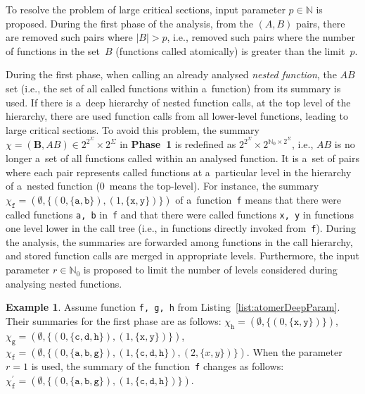 \documentclass{ExcelAtFIT}
\theoremstyle{definition}
\newtheorem{example}{Example}[section]
\begin{document}
To resolve the problem of large critical sections, input parameter $ p \in \mathbb{N} $ is proposed. During the first phase of the analysis, from the ${ (A, B) }$ pairs, there are removed such pairs where $ |B| > p $, i.e., removed such pairs where the number of functions in the set~$ B $ (functions called atomically) is greater than the limit~$ p $.

During the first phase, when calling an already analysed \emph{nested function}, the $ AB $ set (i.e., the set of all called functions within a~function) from its summary is used. If there is a~deep hierarchy of nested function calls, at the top level of the hierarchy, there are used function calls from all lower-level functions, leading to large critical sections. To avoid this problem, the summary $ \chi = {(\boldsymbol{B}, AB)} \in 2^{2^\Sigma} \times 2^\Sigma $ in \textbf{Phase~1} is redefined as $ 2^{2^\Sigma} \times 2^{\mathbb{N}_0 \times 2^\Sigma} $, i.e., $ AB $ is no longer a~set of all functions called within an analysed function. It is a~set of pairs where each pair represents called functions at a~particular level in the hierarchy of a~nested function (0~means the top-level). For instance, the summary $ \chi_\mathtt{f} = (\emptyset, \{{(0, \{\mathtt{a, b}\})}, {(1, \{\mathtt{x, y}\})}\}) $ of a~function~\texttt{f} means that there were called functions \texttt{a, b} in~\texttt{f} and that there were called functions \texttt{x, y} in functions one level lower in the call tree (i.e., in functions directly invoked from~\texttt{f}). During the analysis, the summaries are forwarded among functions in the call hierarchy, and stored function calls are merged in appropriate levels. Furthermore, the input parameter $ r \in \mathbb{N}_0 $ is proposed to limit the number of levels considered during analysing nested functions.

\begin{example}
    Assume function \texttt{f, g, h} from Listing~\ref{list:atomerDeepParam}. Their summaries for the first phase are as follows: $ \chi_\mathtt{h} = (\emptyset, \{(0, \{\mathtt{x, y}\})\}) $, $ \chi_\mathtt{g} = (\emptyset, \{(0, \{\mathtt{c, d, h}\}), \allowbreak (1, \{\mathtt{x, y}\})\}) $, $ \chi_\mathtt{f} = (\emptyset, \{(0, \{\mathtt{a, b, g}\}), (1, \{\mathtt{c, d, h}\}), (2, \allowbreak \{x, y\})\}) $. When the parameter $ r = 1 $ is used, the summary of the function~\texttt{f} changes as follows: $ \chi_\mathtt{f}^\prime = (\emptyset, \{(0, \{\mathtt{a, b, g}\}), (1, \{\mathtt{c, d, h}\})\}) $.
\end{example}
\end{document}
